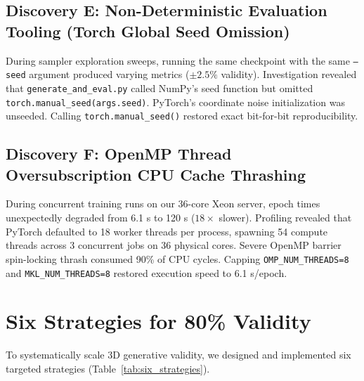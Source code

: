 \documentclass[12pt, a4paper]{article}
\begin{document}
\subsection{Discovery E: Non-Deterministic Evaluation Tooling (Torch Global Seed Omission)}
During sampler exploration sweeps, running the same checkpoint with the same \texttt{--seed} argument produced varying metrics ($\pm 2.5\%$ validity). Investigation revealed that \texttt{generate\_and\_eval.py} called NumPy's seed function but omitted \texttt{torch.manual\_seed(args.seed)}. PyTorch's coordinate noise initialization was unseeded. Calling \texttt{torch.manual\_seed()} restored exact bit-for-bit reproducibility.

\subsection{Discovery F: OpenMP Thread Oversubscription CPU Cache Thrashing}
During concurrent training runs on our 36-core Xeon server, epoch times unexpectedly degraded from 6.1 s to 120 s ($18\times$ slower). Profiling revealed that PyTorch defaulted to 18 worker threads per process, spawning 54 compute threads across 3 concurrent jobs on 36 physical cores. Severe OpenMP barrier spin-locking thrash consumed 90\% of CPU cycles. Capping \texttt{OMP\_NUM\_THREADS=8} and \texttt{MKL\_NUM\_THREADS=8} restored execution speed to 6.1 s/epoch.

\section{Six Strategies for 80\% Validity}

To systematically scale 3D generative validity, we designed and implemented six targeted strategies (Table~\ref{tab:six_strategies}).
\end{document}

